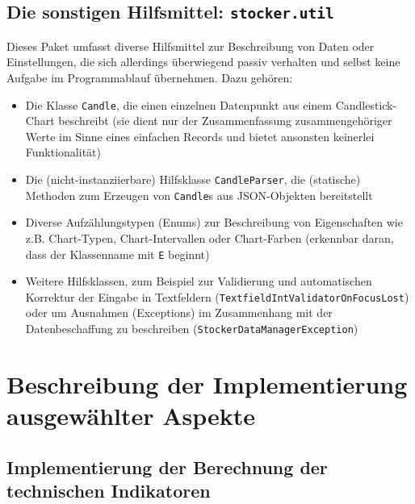 \documentclass[fontsize=12pt, paper=a4, pagesize=auto, twoside=false, DIV=11, draft=false]{scrartcl}
\begin{document}
\subsection{Die sonstigen Hilfsmittel: \texttt{stocker.util}}
Dieses Paket umfasst diverse Hilfsmittel zur Beschreibung von Daten oder Einstellungen, die sich allerdings überwiegend passiv verhalten und selbst keine Aufgabe im Programmablauf übernehmen. Dazu gehören:
\begin{itemize}
\item Die Klasse \texttt{Candle}, die einen einzelnen Datenpunkt aus einem Candlestick-Chart beschreibt (sie dient nur der Zusammenfassung zusammengehöriger Werte im Sinne eines einfachen Records und bietet ansonsten keinerlei Funktionalität)
\item Die (nicht-instanziierbare) Hilfsklasse \texttt{CandleParser}, die (statische) Methoden zum Erzeugen von \texttt{Candle}s aus JSON-Objekten bereitstellt
\item Diverse Aufzählungstypen (Enums) zur Beschreibung von Eigenschaften wie z.B. Chart-Typen, Chart-Intervallen oder Chart-Farben (erkennbar daran, dass der Klassenname mit \texttt{E} beginnt)
\item Weitere Hilfsklassen, zum Beispiel zur Validierung und automatischen Korrektur der Eingabe in Textfeldern (\texttt{Text\-field\-Int\-Vali\-da\-tor\-On\-Fo\-cus\-Lost}) oder um Ausnahmen (Exceptions) im Zusammenhang mit der Datenbeschaffung zu beschreiben (\texttt{StockerDataManagerException})
\end{itemize}

\section{Beschreibung der Implementierung ausgewählter Aspekte}
\label{sec:Implementierung}

\subsection{Implementierung der Berechnung der technischen Indikatoren}
\end{document}
